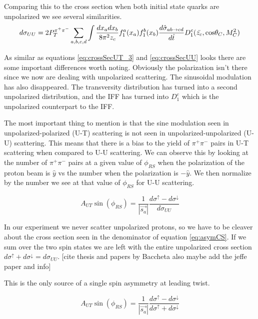 \documentclass[abstract = on,listof=totoc, bibliography=totoc]{scrreprt}
\newcommand{\phirs}{\phi_{RS}}
\newcommand{\ptpair}{P_{T}^{\pi^+\pi^-}}
\newcommand{\pip}{\pi^+}
\newcommand{\pim}{\pi^-}
\newcommand{\pair}{$\pip\pim$ }
\begin{document}
Comparing this to the cross section when both initial state quarks are unpolarized we see several similarities.
\begin{equation}
\label{eq:crossSecUU}
d\sigma_{UU} = 2 \ptpair \sum_{a,b,c,d} \int \frac{dx_adx_b}{8\pi^2z_c} f_1^a(x_a)f_1^b(x_b) \frac{d\hat{\sigma}_{ab \rightarrow cd}}{d\hat{t}}D_1^c(\bar{z_c},\textnormal{cos}\theta_C,M_C^2)
\end{equation}

As similar as equations \ref{eq:crossSecUT_3} and \ref{eq:crossSecUU} looks there are some important differences worth noting. Obviously the polarization isn't there since we now are dealing with unpolarized scattering. The sinusoidal modulation has also disappeared. The transversity distribution has turned into a second unpolarized distribution, and the IFF has turned into $D_1^c$ which is the unpolarized counterpart to the IFF.   

The most important thing to mention is that the sine modulation seen in unpolarized-polarized (U-T) scattering is not seen in unpolarized-unpolarized (U-U) scattering. This means that there is a bias to the yield of \pair pairs in U-T scattering when compared to U-U scattering. We can observe this by looking at the number of \pair pairs at a given value of $\phirs$ when the polarization of the proton beam is $\hat{y}$ vs the number when the polarization is $-\hat{y}$. We then normalize by the number we see at that value of $\phirs$ for U-U scattering. 

\begin{equation}
\label{eq:asymCS}
A_{UT} \sin (\phirs) =\frac{1}{|\vec{s_a}|} \frac{d\sigma^\uparrow - d\sigma^\downarrow}{d\sigma_{UU}}
\end{equation}

In our experiment we never scatter unpolarized protons, so we have to be cleaver about the cross section seen in the denominator of equation \ref{eq:asymCS}. If we sum over the two spin states we are left with the entire unpolarized cross section $d\sigma^\uparrow + d\sigma^\downarrow = d\sigma_{UU}$. [cite thesis and papers by Baccheta also maybe add the jeffe paper and info] 

This is the only source of a single spin asymmetry at leading twist.\cite{bacchettaRedici2}

\begin{equation}
\label{eq:asymCS}
A_{UT} \sin (\phirs) =\frac{1}{|\vec{s_a}|} \frac{d\sigma^\uparrow - d\sigma^\downarrow}{d\sigma^\uparrow + d\sigma^\downarrow}
\end{equation}
\end{document}
